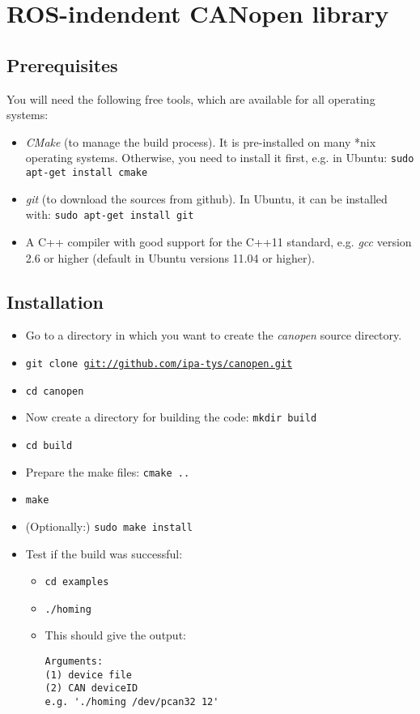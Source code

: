  \section{ROS-indendent CANopen library}
\label{chap:installation:canopen}

\subsection{Prerequisites}

You will need the following free tools, which are available for all operating systems:
\begin{itemize}
\item {\em CMake} (to manage the build process). It is pre-installed on many *nix operating systems. Otherwise, you need to install it first, e.g. in Ubuntu:
\texttt{sudo apt-get install cmake}
\item {\em git} (to download the sources from github). In Ubuntu, it can be installed with: \texttt{sudo apt-get install git}
\item A C++ compiler with good support for the C++11 standard, e.g. {\em gcc} version 2.6 or higher (default in Ubuntu versions 11.04 or higher).
\end{itemize}

\subsection{Installation}

\begin{itemize}
\item Go to a directory in which you want to create the {\em canopen} source directory.
\item \texttt{git clone \url{git://github.com/ipa-tys/canopen.git}}
\item \texttt{cd canopen}
\item Now create a directory for building the code: \texttt{mkdir build}
\item \texttt{cd build}
\item Prepare the make files: \texttt{cmake ..}
\item \texttt{make}
\item (Optionally:) \texttt{sudo make install}
\item Test if the build was successful:
\begin{itemize} 
\item \texttt{cd examples}
\item \texttt{./homing}
\item This should give the output:
{\scriptsize
\begin{verbatim}
Arguments:
(1) device file
(2) CAN deviceID
e.g. './homing /dev/pcan32 12'
\end{verbatim}}
\end{itemize}
\end{itemize}

